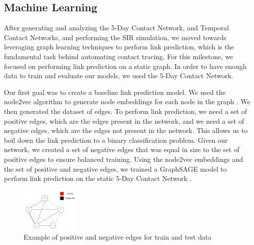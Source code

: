 \documentclass[times, 10pt,twocolumn]{article}
\begin{document}
\subsection{Machine Learning}



After generating and analyzing the 5-Day Contact Network, and Temporal Contact Networks, and performing the SIR simulation, we moved towards leveraging graph learning techniques to perform link prediction, which is the fundamental task behind automating contact tracing. For this milestone, we focused on performing link prediction on a static graph. In order to have enough data to train and evaluate our models, we used the 5-Day Contact Network. 

Our first goal was to create a baseline link prediction model. We used the node2vec algorithm to generate node embeddings for each node in the graph \cite{grover2016node2vec}. We then generated the dataset of edges. To perform link prediction, we need a set of positive edges, which are the edges present in the network, and we need a set of negative edges, which are the edges not present in the network. This allows us to boil down the link prediction to a binary classification problem. Given our network, we created a set of negative edges that was equal in size to the set of positive edges to ensure balanced training. Using the node2vec embeddings and the set of positive and negative edges, we trained a GraphSAGE model to perform link prediction on the static 5-Day Contact Network \cite{hamilton2018inductive}.

\begin{figure}
    \centering
    \includegraphics[width=0.25\textwidth]{imgs/static_prediction_data_split.png}
    \caption{Example of positive and negative edges for train and test data}
    \label{fig:toy_edges_label}
\end{figure}
\end{document}
